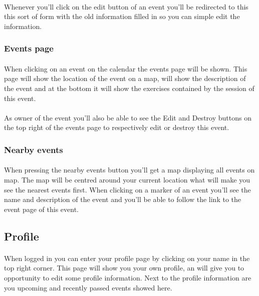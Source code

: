 \documentclass[11pt,a4paper]{scrartcl}
\begin{document}
\paragraph{}Whenever you'll click on the edit button of an event you'll be redirected to this this sort of form with the old information filled in so you can simple edit the information.
\subsubsection{Events page}
\paragraph{}When clicking on an event on the calendar the events page will be shown. This page will show the location of the event on a map, will show the description of the event and at the bottom it will show the exercises contained by the session of this event.
\paragraph{}As owner of the event you'll also be able to see the Edit and Destroy buttons on the top right of the events page to respectively edit or destroy this event.
\subsubsection{Nearby events}
\paragraph{}When pressing the nearby events button you'll get a map displaying all events on map. The map will be centred around your current location what will make you see the nearest events first. When clicking on a marker of an event you'll see the name and description of the event and you'll be able to follow the link to the event page of this event.
\subsection{Profile}
\paragraph{}When logged in you can enter your profile page by clicking on your name in the top right corner. This page will show you your own profile, an will give you to opportunity to edit some profile information. Next to the profile information are you upcoming and recently passed events showed here.
\end{document}
